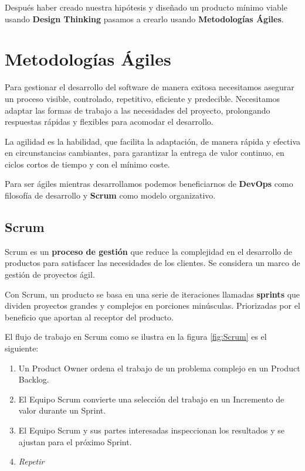 \documentclass[12pt,twoside,titlepage]{report}
\begin{document}
Después haber creado nuestra hipótesis y diseñado un producto mínimo viable usando \textbf{Design Thinking} pasamos a crearlo usando \textbf{Metodologías Ágiles}.

\chapter{Metodologías Ágiles}

Para gestionar el desarrollo del software de manera exitosa necesitamos asegurar un proceso visible, controlado, repetitivo, eficiente y predecible. Necesitamos adaptar las formas de trabajo a las necesidades del proyecto, prolongando respuestas rápidas y flexibles para acomodar el desarrollo.

La agilidad es la habilidad, que facilita la adaptación, de manera rápida y efectiva en circunstancias cambiantes, para garantizar la entrega de valor continuo, en ciclos cortos de tiempo y con el mínimo coste.

Para ser ágiles mientras desarrollamos podemos beneficiarnos de \textbf{DevOps} como filosofía de desarrollo y \textbf{Scrum} como modelo organizativo.

\section{Scrum}

Scrum es un \textbf{proceso de gestión} que reduce la complejidad en el desarrollo de productos para satisfacer las necesidades de los clientes. Se considera un marco de gestión de proyectos ágil.

Con Scrum, un producto se basa en una serie de iteraciones llamadas \textbf{sprints} que dividen proyectos grandes y complejos en porciones minúsculas. Priorizadas por el beneficio que aportan al receptor del producto.

El flujo de trabajo en Scrum como se ilustra en la figura \ref{fig:Scrum} es el siguiente:

\begin{enumerate}
    \item Un Product Owner ordena el trabajo de un problema complejo en un Product Backlog.
    \item El Equipo Scrum convierte una selección del trabajo en un Incremento de valor durante un Sprint.
    \item El Equipo Scrum y sus partes interesadas inspeccionan los resultados y se ajustan para el próximo Sprint.
    \item \textit{Repetir}
\end{enumerate}
\end{document}
